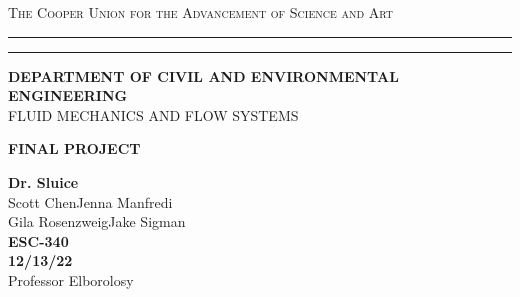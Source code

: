 \begin{titlepage}
    \begin{center}
    {{\Large{\textsc{The Cooper Union for the Advancement of Science and Art}}}} \rule[0.1cm]{15.8cm}{0.1mm}
    \rule[0.5cm]{15.8cm}{0.6mm}
    {\small{\bf DEPARTMENT OF CIVIL AND ENVIRONMENTAL ENGINEERING}}\\
    {\footnotesize{FLUID MECHANICS AND FLOW SYSTEMS}}
    \end{center}
    \vspace{15mm}
    \begin{center}
    \vspace{5mm}
    {\Large{\bf FINAL PROJECT\\}}
    \end{center}
    \vspace{35mm}
    \par
    \noindent
    \hfill
    \vspace{20mm}
    \begin{center}
    {\large{ {\bf Dr. Sluice} \\ { Scott Chen\hspace{5mm}Jenna Manfredi\\Gila Rosenzweig\hspace{5mm}Jake Sigman}}}
    \vspace{40mm}
    {\large {\bf \\ESC-340 \\ 12/13/22 \\}}
    \vspace{15mm}
    {\normalsize{Professor Elborolosy}}
    \end{center}
\end{titlepage}